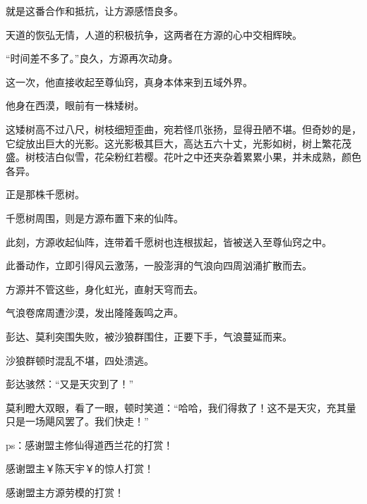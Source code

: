 \begin{this_body}
就是这番合作和抵抗，让方源感悟良多。

天道的恢弘无情，人道的积极抗争，这两者在方源的心中交相辉映。

“时间差不多了。”良久，方源再次动身。

这一次，他直接收起至尊仙窍，真身本体来到五域外界。

他身在西漠，眼前有一株矮树。

这矮树高不过八尺，树枝细短歪曲，宛若怪爪张扬，显得丑陋不堪。但奇妙的是，它绽放出巨大的光影。这光影极其巨大，高达五六十丈，光影如树，树上繁花茂盛。树枝洁白似雪，花朵粉红若樱。花叶之中还夹杂着累累小果，并未成熟，颜色各异。

正是那株千愿树。

千愿树周围，则是方源布置下来的仙阵。

此刻，方源收起仙阵，连带着千愿树也连根拔起，皆被送入至尊仙窍之中。

此番动作，立即引得风云激荡，一股澎湃的气浪向四周汹涌扩散而去。

方源并不管这些，身化虹光，直射天穹而去。

气浪卷席周遭沙漠，发出隆隆轰鸣之声。

彭达、莫利突围失败，被沙狼群围住，正要下手，气浪蔓延而来。

沙狼群顿时混乱不堪，四处溃逃。

彭达骇然：“又是天灾到了！”

莫利瞪大双眼，看了一眼，顿时笑道：“哈哈，我们得救了！这不是天灾，充其量只是一场飓风罢了。我们快走！”

ps：感谢盟主修仙得道西兰花的打赏！

感谢盟主￥陈天宇￥的惊人打赏！

感谢盟主方源劳模的打赏！

\end{this_body}

